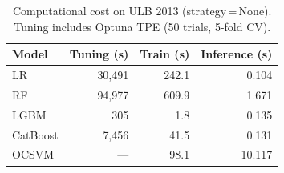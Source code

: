 \begin{table}[ht!]
\centering
\caption{Computational cost on ULB 2013 (strategy\,=\,None). Tuning includes Optuna TPE (50 trials, 5-fold CV).}
\label{tab:cost_ulb}
\begin{tabular}{l r r r}
\toprule
Model & Tuning (s) & Train (s) & Inference (s) \\
\midrule
LR         & 30,491 & 242.1 & 0.104 \\
RF         & 94,977 & 609.9 & 1.671 \\
LGBM       & 305 & 1.8 & 0.135 \\
CatBoost   & 7,456 & 41.5 & 0.131 \\
OCSVM      & --- & 98.1 & 10.117 \\
\bottomrule
\end{tabular}
\end{table}